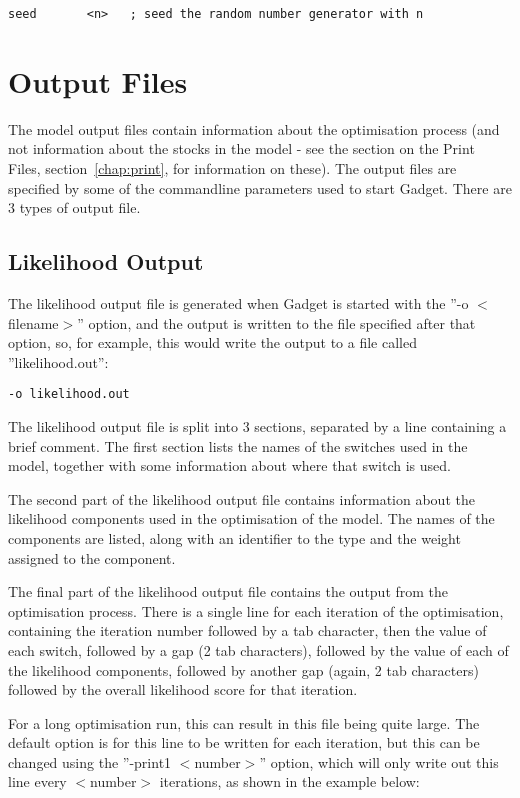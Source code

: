 \documentclass [a4paper, 10pt]{book}
\begin{document}
{\small\begin{verbatim}
seed       <n>   ; seed the random number generator with n
\end{verbatim}}

\chapter{Output Files}\label{chap:output}
The model output files contain information about the optimisation process (and not information about the stocks in the model - see the section on the Print Files, section~\ref{chap:print}, for information on these).  The output files are specified by some of the commandline parameters used to start Gadget.  There are 3 types of output file.

\section{Likelihood Output}\label{sec:likelihoodoutput}
The likelihood output file is generated when Gadget is started with the ''-o $<$filename$>$'' option, and the output is written to the file specified after that option, so, for example, this would write the output to a file called ''likelihood.out'':

{\small\begin{verbatim}
-o likelihood.out
\end{verbatim}}

The likelihood output file is split into 3 sections, separated by a line containing a brief comment.  The first section lists the names of the switches used in the model, together with some information about where that switch is used.

\bigskip
The second part of the likelihood output file contains information about the likelihood components used in the optimisation of the model.  The names of the components are listed, along with an identifier to the type and the weight assigned to the component.

\bigskip
The final part of the likelihood output file contains the output from the optimisation process.  There is a single line for each iteration of the optimisation, containing the iteration number followed by a tab character, then the value of each switch, followed by a gap (2 tab characters), followed by the value of each of the likelihood components, followed by another gap (again, 2 tab characters) followed by the overall likelihood score for that iteration.

\bigskip
For a long optimisation run, this can result in this file being quite large.  The default option is for this line to be written for each iteration, but this can be changed using the ''-print1 $<$number$>$'' option, which will only write out this line every $<$number$>$ iterations, as shown in the example below:
\end{document}
